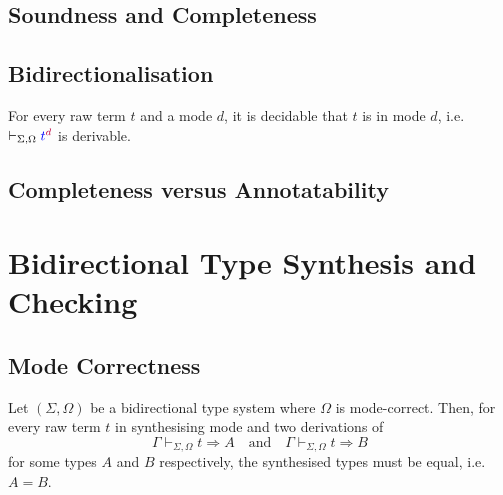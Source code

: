 \documentclass[acmsmall,screen]{acmart}
\theoremstyle{acmdefinition}
\begin{document}
\subsection{Soundness and Completeness}
\begin{theorem}[Soundness]\label{thm:term-soundness}
    
\end{theorem}



\begin{theorem}[Completeness]\label{thm:term-completeness}
    
\end{theorem}

\subsection{Bidirectionalisation}
\begin{proposition} \label{thm:bidirectionalisation}
  For every raw term $t$ and a mode $d$, it is decidable that $t$ is in mode $d$, i.e.\ $\vdash_{\Sigma, \Omega} {\textcolor{blue}{t}}^{\mathrel{\textcolor{purple}{d}}}$ is derivable.
\end{proposition}

\subsection{Completeness versus Annotatability}


\section{Bidirectional Type Synthesis and Checking} \label{sec:type-synthesis}

\subsection{Mode Correctness}

\begin{theorem}\label{thm:unique-syn}
  Let $(\Sigma, \Omega)$ be a bidirectional type system where $\Omega$ is mode-correct.
  Then, for every raw term $t$ in synthesising mode and two derivations of 
  \[
    \Gamma \vdash_{\Sigma, \Omega} t \Rightarrow A
    \quad\text{and}\quad
    \Gamma \vdash_{\Sigma, \Omega} t \Rightarrow B
  \]
  for some types $A$ and $B$ respectively, the synthesised types must be equal, i.e.\ $A = B$.
\end{theorem}
 
\end{document}
